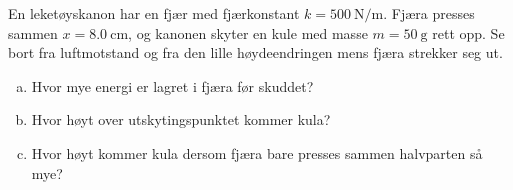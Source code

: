 %
En leketøyskanon har en fjær med fjærkonstant $k = \SI{500}{\newton\per\metre}$. Fjæra presses sammen $x = \SI{8.0}{\centi\metre}$, og kanonen skyter en kule med masse $m = \SI{50}{\gram}$ rett opp. Se bort fra luftmotstand og fra den lille høydeendringen mens fjæra strekker seg ut.
\begin{enumerate}[a)]
    \item Hvor mye energi er lagret i fjæra før skuddet?
    \item Hvor høyt over utskytingspunktet kommer kula?
    \item Hvor høyt kommer kula dersom fjæra bare presses sammen halvparten så mye?
\end{enumerate}
